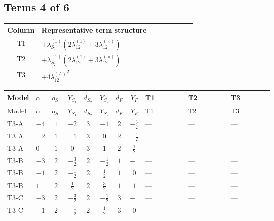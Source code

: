 \documentclass[8pt]{article}
\begin{document}
\begin{landscape}
\subsection*{Terms 4 of 6}
\begin{center}
\begin{tabular}{@{}c >{\raggedright\arraybackslash}p{0.82\linewidth}@{}}
\toprule
Column & Representative term structure \\
\midrule
T1 & \(\displaystyle +{\lambda_{S_1}^{(1)}} (2 {\lambda_{12}^{(1)}}+3 {\lambda_{12}^{(\times)}})\) \\
\midrule
T2 & \(\displaystyle +{\lambda_{S_2}^{(1)}} (2 {\lambda_{12}^{(1)}}+3 {\lambda_{12}^{(\times)}})\) \\
\midrule
T3 & \(\displaystyle +4 {\lambda_{12}^{(A)}}^2\) \\
\midrule
\bottomrule
\end{tabular}
\end{center}
\smallskip
\tiny
\begin{longtable}{@{}llcccccc >{\raggedright\arraybackslash}p{0.21\linewidth} >{\raggedright\arraybackslash}p{0.21\linewidth} >{\raggedright\arraybackslash}p{0.21\linewidth}@{}}
\toprule
Model & $\alpha$ & $d_{S_1}$ & $Y_{S_1}$ & $d_{S_2}$ & $Y_{S_2}$ & $d_F$ & $Y_F$ & T1 & T2 & T3 \\
\midrule
\endfirsthead
\toprule
Model & $\alpha$ & $d_{S_1}$ & $Y_{S_1}$ & $d_{S_2}$ & $Y_{S_2}$ & $d_F$ & $Y_F$ & T1 & T2 & T3 \\
\midrule
\endhead
T3-A & $-4$ & $1$ & $-2$ & $3$ & $-1$ & $2$ & $-\frac{3}{2}$ & --- & --- & --- \\
\midrule
T3-A & $-2$ & $1$ & $-1$ & $3$ & $0$ & $2$ & $-\frac{1}{2}$ & --- & --- & --- \\
\midrule
T3-A & $0$ & $1$ & $0$ & $3$ & $1$ & $2$ & $\frac{1}{2}$ & --- & --- & --- \\
\midrule
T3-B & $-3$ & $2$ & $-\frac{3}{2}$ & $2$ & $-\frac{1}{2}$ & $1$ & $-1$ & --- & --- & --- \\
\midrule
T3-B & $-1$ & $2$ & $-\frac{1}{2}$ & $2$ & $\frac{1}{2}$ & $1$ & $0$ & --- & --- & --- \\
\midrule
T3-B & $1$ & $2$ & $\frac{1}{2}$ & $2$ & $\frac{3}{2}$ & $1$ & $1$ & --- & --- & --- \\
\midrule
T3-C & $-3$ & $2$ & $-\frac{3}{2}$ & $2$ & $-\frac{1}{2}$ & $3$ & $-1$ & --- & --- & --- \\
\midrule
T3-C & $-1$ & $2$ & $-\frac{1}{2}$ & $2$ & $\frac{1}{2}$ & $3$ & $0$ & --- & --- & --- \\

\end{longtable}
\end{landscape}
\end{document}
